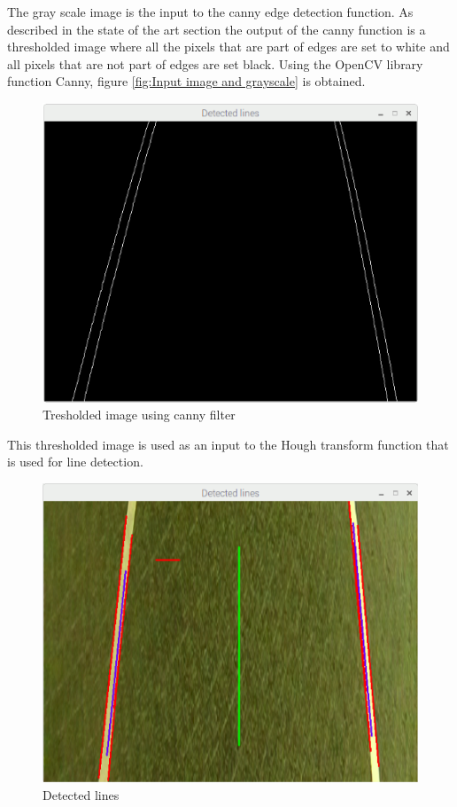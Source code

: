 The gray scale image is the input to the canny edge detection function. As described in the state of the art section the output of the canny function is a thresholded image where all the pixels that are part of edges are set to white and all pixels that are not part of edges are set black. Using the OpenCV library function Canny, figure \ref{fig:Input image and grayscale} is obtained.

\begin{figure}[H]
  \includegraphics[width=\textwidth]{./img/edges22.png}
  \centering
  \caption{Tresholded image using canny filter}
  \label{fig:Tresholded image using canny filter}
\end{figure}

This thresholded image is used as an input to the Hough transform function that is used for line detection.


\begin{figure}[H]
  \includegraphics[width=\textwidth]{./img/detected.png}
  \centering
  \caption{Detected lines}
  \label{fig:Detected lines}
\end{figure}

